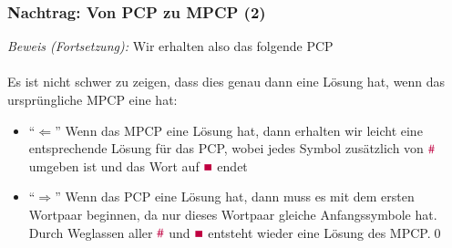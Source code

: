 \documentclass[onlymath]{beamer}
\begin{document}
\begin{frame}[t]\frametitle{Nachtrag: Von PCP zu MPCP (2)}

% 

\emph{Beweis (Fortsetzung):} Wir erhalten also das folgende PCP\\[1ex]
\\[1ex]
%
Es ist nicht schwer zu zeigen, dass dies genau dann eine Lösung hat, wenn das ursprüngliche MPCP eine hat:\pause
\begin{itemize}
\item "`$\Leftarrow$"' Wenn das MPCP eine Lösung hat, dann erhalten wir leicht eine entsprechende Lösung für das PCP, wobei jedes Symbol zusätzlich von $\mathtt{\textcolor{purple}{\#}}$ umgeben ist und das Wort auf $\mathtt{\textcolor{purple}{\blacksquare}}$ endet\pause
\item "`$\Rightarrow$"' Wenn das PCP eine Lösung hat, dann muss es mit dem ersten Wortpaar beginnen, da nur dieses Wortpaar gleiche Anfangssymbole hat. Durch Weglassen aller $\mathtt{\textcolor{purple}{\#}}$ und 
$\mathtt{\textcolor{purple}{\blacksquare}}$ entsteht wieder eine Lösung des MPCP.\qed
\end{itemize}

\end{frame}


\end{document}
